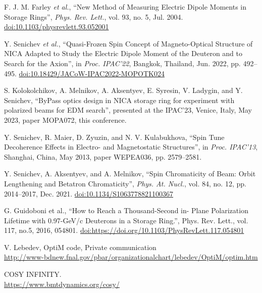 \documentclass[a4paper,
               keeplastbox,   %
               ]{jacow}
\begin{document}
	{\printbibliography}
	{
	\begin{thebibliography}{9}

	F. J. M. Farley \emph{et al.}, \textquotedblleft{New Method of Measuring Electric Dipole Moments in Storage Rings}\textquotedblright, \emph{Phys. Rev. Lett.}, vol. 93, no. 5, Jul. 2004. 
	\url{doi:10.1103/physrevlett.93.052001}
		
   Y. Senichev \emph{et al.},
   \textquotedblleft{Quasi-Frozen Spin Concept of Magneto-Optical Structure of NICA Adapted to Study the Electric Dipole Moment of the Deuteron and to Search for the Axion}\textquotedblright,
   in \emph{Proc. IPAC’22}, Bangkok, Thailand, Jun. 2022, pp. 492--495.
   \url{doi:10.18429/JACoW-IPAC2022-MOPOTK024} 
   
   S. Kolokolchikov, A. Melnikov, A. Aksentyev, E. Syresin, V. Ladygin, and Y. Senichev,
   \textquotedblleft{ByPass optics design in NICA storage ring for experiment with polarized beams for EDM search}\textquotedblright,
   presented at the IPAC’23, Venice, Italy, May 2023, paper MOPA072, this conference.   

   Y. Senichev, R. Maier, D. Zyuzin, and N. V. Kulabukhova,
   \textquotedblleft{Spin Tune Decoherence Effects in Electro- and Magnetostatic Structures}\textquotedblright,
   in \emph{Proc. IPAC’13}, Shanghai, China, May 2013, paper WEPEA036, pp. 2579--2581.      
	
	Y. Senichev, A. Aksentyev, and A. Melnikov,  \textquotedblleft{Spin Chromaticity of Beam: Orbit Lengthening and Betatron Chromaticity}\textquotedblright, \emph{Phys. At. Nucl.}, vol. 84, no. 12, pp. 2014–2017, Dec. 2021. 
	\url{doi:10.1134/S1063778821100367}
	
   G. Guidoboni et al.,
   \textquotedblleft{How to Reach a Thousand-Second in- 
	Plane Polarization Lifetime with 0.97-GeV/c Deuterons in a 
	Storage Ring.}\textquotedblright,
   Phys. Rev. Lett., vol. 117, no.5, 2016, 054801.
   	\url{doi:https://doi.org/10.1103/PhysRevLett.117.054801}
       
	V. Lebedev, OptiM code, Private communication
	\\
	\url{http://www-bdnew.fnal.gov/pbar/organizationalchart/lebedev/OptiM/optim.htm}
	
	COSY INFINITY.\\
	\url{https://www.bmtdynamics.org/cosy/}


	\end{thebibliography}
} 
\end{document}
